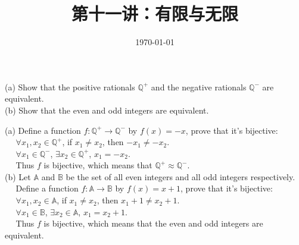 \documentclass[11pt, a4paper, UTF8]{ctexart}
\title{第十一讲：有限与无限}
\date{\today}     %
\begin{document}
\maketitle
\noplagiarism	%
\beginthishw	%

\begin{problem}[UD: 20.4]	%
  (a) Show that the positive rationals $\mathbb{Q}^{+}$ and the negative 
  rationals $\mathbb{Q}^{-}$ are equivalent.\\
  (b) Show that the even and odd integers are equivalent.
\end{problem}

%

\begin{solution}
  (a) Define a function $f: \mathbb{Q}^{+} \rightarrow \mathbb{Q}^{-}$ 
  by $f(x) = -x$, prove that it's bijective:\\
  $~~~~~~\forall x_{1}, x_{2} \in \mathbb{Q}^{+}$, if $x_{1} \neq x_{2}$, 
  then $-x_{1} \neq -x_{2}$.\\
  $~~~~~~\forall x_{1} \in \mathbb{Q}^{-}$, $\exists x_{2} \in \mathbb{Q}^{+}$, 
  $x_{1} = -x_{2}$.\\
  $~~~~~~$Thus $f$ is bijective, which means that $\mathbb{Q}^{+} \approx \mathbb{Q}^{-}$.\\
  (b) Let $\mathbb{A}$ and $\mathbb{B}$ be the set of all even integers 
  and all odd integers respectively.\\
  $~~~~~~$Define a function $f: \mathbb{A} \rightarrow \mathbb{B}$ by 
  $f(x) = x + 1$, prove that it's bijective:\\
  $~~~~~~\forall x_{1}, x_{2} \in \mathbb{A}$, if $x_{1} \neq x_{2}$, 
  then $x_{1} + 1 \neq x_{2} + 1$.\\
  $~~~~~~\forall x_{1} \in \mathbb{B}$, $\exists x_{2} \in \mathbb{A}$, 
  $x_{1} = x_{2} + 1$.\\
  $~~~~~~$Thus $f$ is bijective, which means that the even and odd 
  integers are equivalent.
\end{solution}
\end{document}
